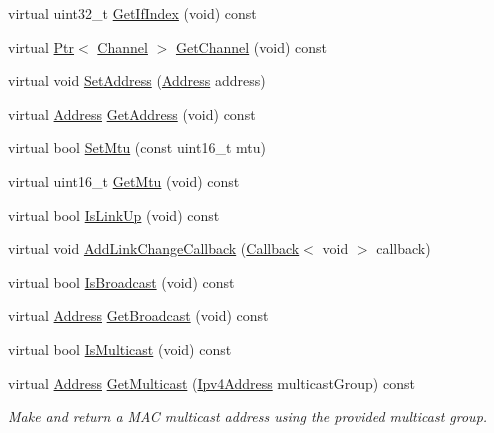 \begin{DoxyCompactItemize}
virtual uint32\+\_\+t \hyperlink{classns3_1_1PointToPointNetDevice_a6c58fd3bae039406ee8e4d59c98c30df}{Get\+If\+Index} (void) const 
\item 
virtual \hyperlink{classns3_1_1Ptr}{Ptr}$<$ \hyperlink{classns3_1_1Channel}{Channel} $>$ \hyperlink{classns3_1_1PointToPointNetDevice_a925b68484974b6e687ce1f5b4a74d4e0}{Get\+Channel} (void) const 
\item 
virtual void \hyperlink{classns3_1_1PointToPointNetDevice_accfb735173bfde385aba11aa18a87ae7}{Set\+Address} (\hyperlink{classns3_1_1Address}{Address} address)
\item 
virtual \hyperlink{classns3_1_1Address}{Address} \hyperlink{classns3_1_1PointToPointNetDevice_ab14066cb7407011613577af80d55a46f}{Get\+Address} (void) const 
\item 
virtual bool \hyperlink{classns3_1_1PointToPointNetDevice_a32dc878b14e4b02361529db8414644f1}{Set\+Mtu} (const uint16\+\_\+t mtu)
\item 
virtual uint16\+\_\+t \hyperlink{classns3_1_1PointToPointNetDevice_a5bc86d4e92218363bd2eafa362c82095}{Get\+Mtu} (void) const 
\item 
virtual bool \hyperlink{classns3_1_1PointToPointNetDevice_ae60bd9da84487cd401ff5ade4c5d51fb}{Is\+Link\+Up} (void) const 
\item 
virtual void \hyperlink{classns3_1_1PointToPointNetDevice_ac77cef9b09811c3587f94761d696d586}{Add\+Link\+Change\+Callback} (\hyperlink{classns3_1_1Callback}{Callback}$<$ void $>$ callback)
\item 
virtual bool \hyperlink{classns3_1_1PointToPointNetDevice_ae824d2fe438f4e3635174801d01e826d}{Is\+Broadcast} (void) const 
\item 
virtual \hyperlink{classns3_1_1Address}{Address} \hyperlink{classns3_1_1PointToPointNetDevice_ae51576bfce6f4620ffc09bcce3e2fba9}{Get\+Broadcast} (void) const 
\item 
virtual bool \hyperlink{classns3_1_1PointToPointNetDevice_a9249c2569687b46aac452531dc858e29}{Is\+Multicast} (void) const 
\item 
virtual \hyperlink{classns3_1_1Address}{Address} \hyperlink{classns3_1_1PointToPointNetDevice_a6480000734907fdc5ed8d56a334b21d4}{Get\+Multicast} (\hyperlink{classns3_1_1Ipv4Address}{Ipv4\+Address} multicast\+Group) const 
\begin{DoxyCompactList}\small\item\em Make and return a M\+AC multicast address using the provided multicast group. \end{DoxyCompactList}\item 

\end{DoxyCompactItemize}
